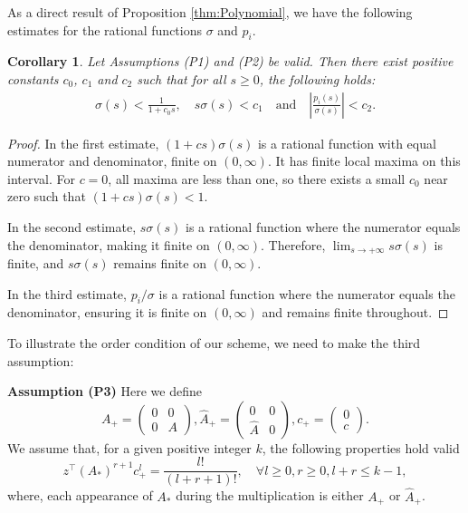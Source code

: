 \documentclass[a4paper, oneside]{book}
\def\hatA{{\hat{A}}}
\def\hatb{{\hat{b}}}
\def\As{{A_+}}
\def\Ahs{{\hatA_+}}
\newtheorem{corollary}{Corollary}[section]
\begin{document}
As a direct result of Proposition \ref{thm:Polynomial}, we have the following estimates for the rational functions $\sigma$ and $p_i$.
\begin{corollary}\label{prop:PiSigmaBound}
Let Assumptions (P1) and (P2) be valid.  Then there exist positive constants $c_0$, $c_1$ and $c_2$  such that for all $s \ge 0$, the following holds:
\begin{equation*} 
\begin{aligned} 
\sigma(s) < \frac{1}{1+c_0s}, \quad  
 s \sigma(s)  < c_1 \quad \text{and} \quad
 \left\lvert \frac{p_i(s)}{\sigma(s)} \right\rvert< c_2 .
 \end{aligned}
\end{equation*}
\end{corollary}
\begin{proof}
In the first estimate, $(1+cs)\sigma(s)$ is a rational function with equal numerator and denominator, finite on $(0, \infty)$. It has finite local maxima on this interval. For $c=0$, all maxima are less than one, so there exists a small $c_0$ near zero such that $(1+cs)\sigma(s) < 1$.

In the second estimate, $s\sigma(s)$ is a rational function where the numerator equals the denominator, making it finite on $(0, \infty)$. Therefore, $\lim_{s \to +\infty} s\sigma(s)$ is finite, and $s\sigma(s)$ remains finite on $(0, \infty)$.

In the third estimate, ${p_i}/{\sigma}$ is a rational function where the numerator equals the denominator, ensuring it is finite on $(0, \infty)$ and remains finite throughout. 

\end{proof}

 To illustrate the order condition of our scheme, we need to make the third assumption: 

\noindent\textbf{Assumption (P3)} 
Here we define
$$A_+ = \begin{pmatrix}0 & 0 \\ 0 & A \end{pmatrix}, \hatA_+ = \begin{pmatrix}0 & 0 \\ \hatA & 0 \end{pmatrix}, 
c_+ = \begin{pmatrix}0 \\c\end{pmatrix}.$$
We assume that, for a given positive integer $k$, the following properties hold valid
\begin{equation}\label{eq:ass_p3}
    z^\top( A_*)^{r+1} c_+^l = \frac{l!}{(l+r+1)!}, \quad \forall l\geq 0, r\geq 0, l+r\leq k-1,
\end{equation}
where, each appearance of $A_*$ during the multiplication is either $\As$ or $\Ahs$. 
    
\end{document}

